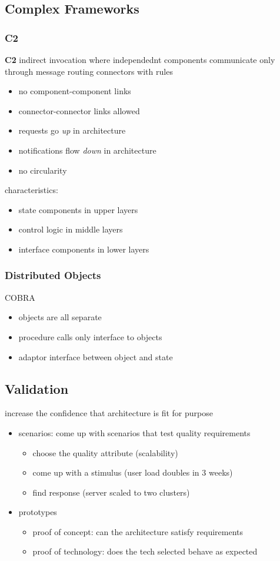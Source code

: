 \documentclass[]{article}
\theoremstyle{definition}
\begin{document}
	\subsection{Complex Frameworks}
	\subsubsection{C2}
	\textbf{C2} indirect invocation where independednt components communicate only through message routing connectors with rules
	\begin{itemize}
		\item no component-component links
		\item connector-connector links allowed
		\item requests go \textit{up} in architecture
		\item notifications flow \textit{down} in architecture
		\item no circularity
	\end{itemize}
	characteristics:
	\begin{itemize}
		\item state components in upper layers
		\item control logic in middle layers
		\item interface components in lower layers
	\end{itemize}

	\subsubsection{Distributed Objects}
	COBRA
	\begin{itemize}
		\item objects are all separate
		\item procedure calls only interface to objects
		\item adaptor interface between object and state
	\end{itemize}

	\subsection{Validation}
	increase the confidence that architecture is fit for purpose
	\begin{itemize}
		\item scenarios: come up with scenarios that test quality requirements
			\begin{itemize}
				\item choose the quality attribute (scalability)
				\item come up with a stimulus (user load doubles in 3 weeks)
				\item find response (server scaled to two clusters)
			\end{itemize}
		\item prototypes
			\begin{itemize}
				\item proof of concept: can the architecture satisfy requirements
				\item proof of technology: does the tech selected behave as expected
			\end{itemize}
	\end{itemize}
\end{document}
